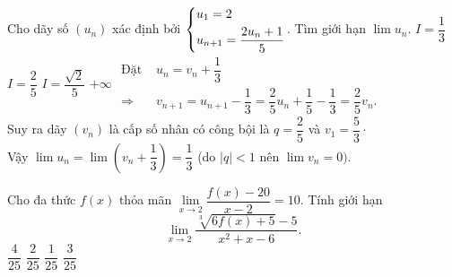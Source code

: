 \begin{vd}%
	Cho dãy số $ \left(u_n\right) $ xác định bởi  $\left\{\begin{aligned}&u_1 = 2\\ &u_{n+1} = \dfrac{2u_n + 1}{5}\end{aligned}\right. $. Tìm giới hạn $ \lim u_n. $
	\choice
	{\True  $ I= \dfrac{1}{3} $}
	{ $ I = \dfrac{2}{5} $}
	{ $ I  = \dfrac{\sqrt{2}}{5} $}
	{ $ +\infty $}	
	\loigiai
	{$\begin{aligned}
		\text{Đặt } &u_n = v_n + \dfrac{1}{3} \\
		\Rightarrow &v_{n+1} = u_{n+1} - \dfrac{1}{3} = \dfrac{2}{5} u_n + \dfrac{1}{5} - \dfrac{1}{3} = \dfrac{2}{5} v_n.
		\end{aligned}$\\
		Suy ra dãy $ \left(v_n\right) $ là cấp số nhân có công bội là $ q = \dfrac{2}{5} $ và $ v_1 = \dfrac{5}{3} \cdot $\\
		Vậy $ \lim u_n = \lim \left(v_n + \dfrac{1}{3}\right) = \dfrac{1}{3}$ (do $ \left|q \right| < 1  $ nên $ \lim v_n = 0). $
	}
\end{vd}
\begin{vd}%
	Cho đa thức $ f(x) $ thỏa mãn $ \lim\limits_{x\to 2}\dfrac{f(x)-20}{x-2}=10 $. Tính giới hạn
	\[ 
	\lim\limits_{x\to 2}\dfrac{\sqrt[3]{6f(x)+5}-5}{x^{2}+x-6}.
	\]
	\choice
	{\True $ \dfrac{4}{25} $}
	{$ \dfrac{2}{25} $}
	{$ \dfrac{1}{25} $}
	{$ \dfrac{3}{25} $}
\end{vd}